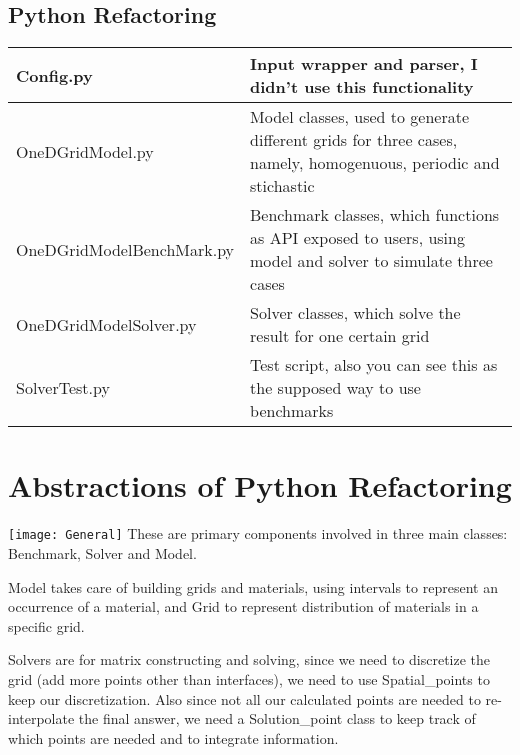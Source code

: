 \documentclass[letter,12pt]{article}
\begin{document}
\subsection{Python Refactoring}
\begin{table}[h]
\centering
\label{my-label}
\begin{tabular}{|l|l|l|}
\hline
Config.py                 & \multicolumn{2}{p{10cm}|}{Input wrapper and parser, I didn't use this functionality}                                                     \\ \hline
OneDGridModel.py          & \multicolumn{2}{p{10cm}|}{\raggedright Model classes, used to generate different grids for three cases, namely, homogenuous, periodic and stichastic} \\ \hline
OneDGridModelBenchMark.py & \multicolumn{2}{p{10cm}|}{\raggedright Benchmark classes, which functions as API exposed to users, using model and solver to simulate three cases}    \\ \hline
OneDGridModelSolver.py    & \multicolumn{2}{p{10cm}|}{\raggedright Solver classes, which solve the result for one certain grid}                                                   \\ \hline
SolverTest.py             & \multicolumn{2}{p{10cm}|}{\raggedright Test script, also you can see this as the supposed way to use benchmarks}                                      \\ \hline
\end{tabular}
\end{table}

\pagebreak

\section{Abstractions of Python Refactoring}
\texttt{[image: General]}
These are primary components involved in three main classes: Benchmark, Solver and Model. 

Model takes care of building grids and materials, using intervals to represent an occurrence of a material, and Grid to represent distribution of materials in a specific grid. 

Solvers are for matrix constructing and solving, since we need to discretize the grid (add more points other than interfaces), we need to use Spatial\_points to keep our discretization. Also since not all our calculated points are needed to re-interpolate the final answer, we need a Solution\_point class to keep track of which points are needed and to integrate information.
\end{document}
